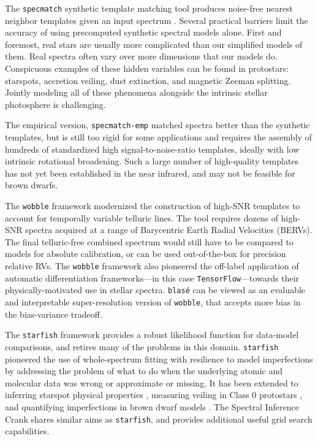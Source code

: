 \documentclass[modern]{aastex631}
\begin{document}
The \texttt{specmatch} synthetic template matching tool produces noise-free nearest neighbor templates given an input spectrum \citep{2015PhDT........82P}.  Several practical barriers limit the accuracy of using precomputed synthetic spectral models alone. First and foremost, real stars are usually more complicated than our simplified models of them. Real spectra often vary over more dimensions that our models do.  Conspicuous examples of these hidden variables can be found in protostars: starspots, accretion veiling, dust extinction, and magnetic Zeeman splitting. Jointly modeling all of these phenomena alongside the intrinsic stellar photosphere is challenging.

The empirical version, \texttt{specmatch-emp} \citep{2017ApJ...836...77Y} matched spectra better than the synthetic templates, but is still too rigid for some applications and requires the assembly of hundreds of standardized high signal-to-noise-ratio templates, ideally with low intrinsic rotational broadening.  Such a large number of high-quality templates has not yet been established in the near infrared, and may not be feasible for brown dwarfs.

The \texttt{wobble} framework \citep{2019AJ....158..164B} modernized the construction of high-SNR templates to account for temporally variable telluric lines. The tool requires dozens of high-SNR spectra acquired at a range of Barycentric Earth Radial Velocities (BERVs).  The final telluric-free combined spectrum would still have to be compared to models for absolute calibration, or can be used out-of-the-box for precision relative RVs.  The \texttt{wobble} framework also pioneered the off-label application of automatic differentiation frameworks---in this case \texttt{TensorFlow}---towards their physically-motivated use in stellar spectra.  \texttt{blas\'e} can be viewed as an evaluable and interpretable super-resolution version of \texttt{wobble}, that accepts more bias in the bias-variance tradeoff.

The \texttt{starfish} framework \citep{czekala15} provides a robust likelihood function for data-model comparisons, and retires many of the problems in this domain.  \texttt{starfish} pioneered the use of whole-spectrum fitting with resilience to model imperfections by addressing the problem of what to do when the underlying atomic and molecular data was wrong or approximate or missing.  It has been extended to inferring starspot physical properties \citep{2017ApJ...836..200G}, measuring veiling in Class 0 protostars \citep{2018ApJ...862...85G}, and quantifying imperfections in brown dwarf models \citep{2021ApJ...921...95Z}.  The Spectral Inference Crank \citep[\texttt{sick},][]{2016ApJS..223....8C} shares similar aims as \texttt{starfish}, and provides additional useful grid search capabilities.
\end{document}
